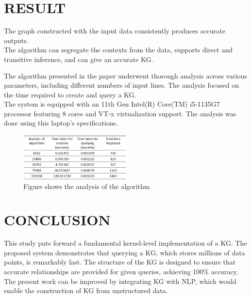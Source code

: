 \documentclass[conference]{IEEEtran}
\begin{document}
\section{RESULT}
The graph constructed with the input data consistently produces accurate outputs.\\
The algorithm can segregate the contexts from the data, supports direct and transitive inference, and can give an accurate KG.

The algorithm presented in the paper underwent thorough analysis across various parameters, including different numbers of input lines. The analysis focused on the time required to create and query a KG.\\
The system is equipped with an 11th Gen Intel(R) Core(TM) i5-1135G7 processor featuring 8 cores and VT-x virtualization support. The analysis was done using this laptop's specifications.


\begin{figure}[htbp]
\centerline{\includegraphics[width=0.5\textwidth]{result_table.png}}
\caption{Figure shows the analysis of the algorithm}
\label{fig}
\end{figure}


\section{CONCLUSION}
This study puts forward a fundamental kernel-level implementation of a KG. 
The proposed system demonstrates that querying a KG, which stores millions of data points, is remarkably fast. 
The structure of the KG is designed to ensure that accurate relationships are provided for given queries, achieving 100\% accuracy.
\\
The present work can be improved by integrating KG with NLP, which would enable the construction of KG from unstructured data.
\end{document}
